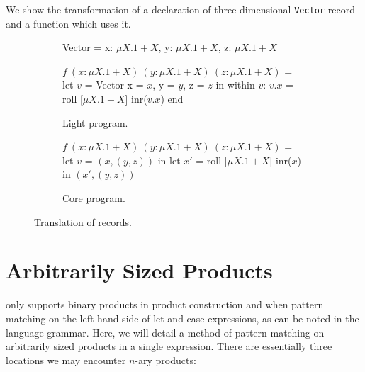 We show the transformation of a declaration of three-dimensional
\texttt{Vector} record and a function which uses it.

\begin{figure}[htp]
  \centering
  \begin{subfigure}[b]{0.90\textwidth}
    \begin{rfuncodenum}
Vector = { x: $\mu X . 1 + X$, y: $\mu X . 1 + X$, z: $\mu X . 1 + X$ }

$f~(x: \mu X . 1 + X)~(y: \mu X . 1 + X)~(z: \mu X . 1 + X)$ =
  let $v$ = Vector { x = $x$, y = $y$, z = $z$ }
  in within $v$:
       $v.x$ = roll [$\mu X . 1 + X$] inr($v.x$)
     end
    \end{rfuncodenum}
    \caption{Light program.}
  \end{subfigure}
  \begin{subfigure}[b]{0.90\textwidth}
    \begin{rfuncodenum}
$f~(x: \mu X . 1 + X)~(y: \mu X . 1 + X)~(z: \mu X . 1 + X)$ =
  let $v$ = $(x, (y, z))$
  in let $x'$ = roll [$\mu X . 1 + X$] inr($x$)
    in $(x', (y, z))$
    \end{rfuncodenum}
    \caption{Core program.}
  \end{subfigure}
  \caption{Translation of records.}\label{fig:record_translation}
\end{figure}

\section{Arbitrarily Sized Products}

\rfunc only supports binary products in product construction and when pattern
matching on the left-hand side of let and case-expressions, as can be noted in
the language grammar. Here, we will detail a method of pattern matching on
arbitrarily sized products in a single expression. There are essentially three
locations we may encounter $n$-ary products:

